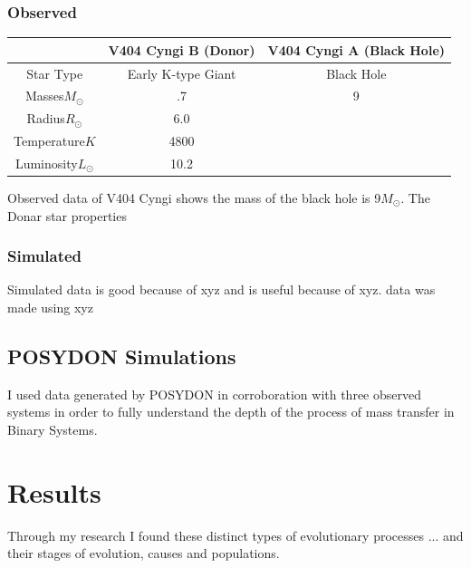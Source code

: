 \documentclass[12pt, letterpaper]{article}
\begin{document}
        \subsubsection{Observed}
        \begin{center}
            \begin{tabular}{||c c c||} 
             \hline
             & V404 Cyngi B (Donor) & V404 Cyngi A (Black Hole) \\ 
             \hline\hline
             Star Type & Early K-type Giant & Black Hole \\ 
             \hline
             Masses\(M_\odot\) & .7 \cite{Bernardini_2016} & 9 \cite{10.1093/mnras/271.1.L10} \\
             \hline
             Radius\(R_\odot\) & 6.0 \cite{10.1093/mnras/271.1.L10} &  \\
             \hline
             Temperature$K$ & 4800 \cite{10.1093/mnras/271.1.L10} & \\
             \hline
             Luminosity\(L_\odot\) & 10.2 \cite{10.1093/mnras/271.1.L10} &  \\ 
             \hline
        \end{tabular} 
        \end{center}
         Observed data of V404 Cyngi shows the mass of the black hole is 9\(M_\odot\). The Donar star properties 

        \subsubsection{Simulated}
        Simulated data is good because of xyz and is useful because of xyz. data was made using xyz

    \subsection{POSYDON Simulations}
         I used data generated by POSYDON \cite{Fragos_2023} in corroboration with three observed systems in order to fully understand the depth of the process of mass transfer in Binary Systems.
    \cite{TaurisvandenHeuvel+2023}


\section{\centering Results}
    Through my research I found these distinct types of evolutionary processes ... and their stages of evolution, causes and populations. 
    
\end{document}
